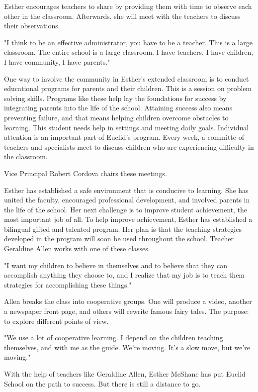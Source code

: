 Esther encourages teachers to share by providing them with time to observe each other in the classroom. Afterwards, she will meet with the teachers to discuss their observations.

"I think to be an effective administrator, you have to be a teacher. This is a large classroom. The entire school is a large classroom. I have teachers, I have children, I have community, I have parents."

One way to involve the community in Esther's extended classroom is to conduct educational programs for parents and their children. This is a session on problem solving skills. Programs like these help lay the foundations for success by integrating parents into the life of the school. Attaining success also means preventing failure, and that means helping children overcome obstacles to learning. This student needs help in settings and meeting daily goals. Individual attention is an important part of Euclid's program. Every week, a committe of teachers and specialists meet to discuss children who are experiencing difficulty in the classroom.

Vice Principal Robert Cordova chairs these meetings.

Esther has established a safe environment that is conducive to learning. She has united the faculty, encouraged professional development, and involved parents in the life of the school. Her next challenge is to improve student achievement, the most important job of all. To help improve achievement, Esther has established a bilingual gifted and talented program. Her plan is that the teaching strategies developed in the program will soon be used throughout the school. Teacher Geraldine Allen works with one of these classes.

"I want my children to believe in themselves and to believe that they can accomplish anything they choose to, and I realize that my job is to teach them strategies for accomplishing these things."

Allen breaks the class into cooperative groups. One will produce a video, another a newspaper front page, and others will rewrite famous fairy tales. The purpose: to explore different points of view.

"We use a lot of cooperative learning. I depend on the children teaching themselves, and with me as the guide. We're moving. It's a slow move, but we're moving."

With the help of teachers like Geraldine Allen, Esther McShane has put Euclid School on the path to success. But there is still a distance to go.

